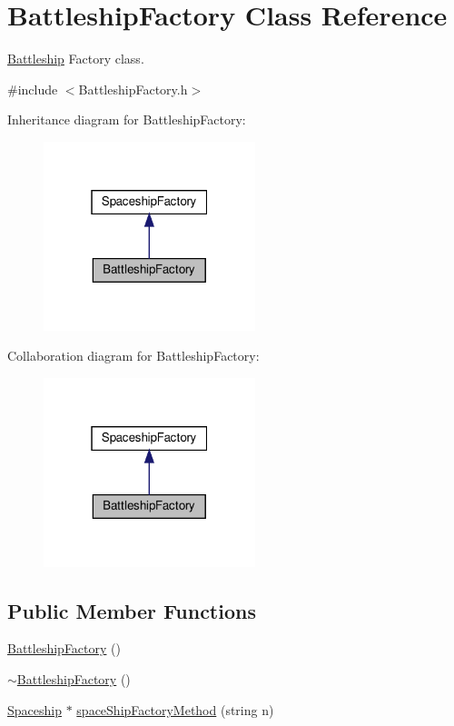 \hypertarget{classBattleshipFactory}{}\section{Battleship\+Factory Class Reference}
\label{classBattleshipFactory}


\hyperlink{classBattleship}{Battleship} Factory class.  




{\ttfamily \#include $<$Battleship\+Factory.\+h$>$}



Inheritance diagram for Battleship\+Factory\+:\nopagebreak
\begin{figure}[H]
\begin{center}
\leavevmode
\includegraphics[width=175pt]{classBattleshipFactory__inherit__graph}
\end{center}
\end{figure}


Collaboration diagram for Battleship\+Factory\+:\nopagebreak
\begin{figure}[H]
\begin{center}
\leavevmode
\includegraphics[width=175pt]{classBattleshipFactory__coll__graph}
\end{center}
\end{figure}
\subsection*{Public Member Functions}
\begin{DoxyCompactItemize}
\item 
\hyperlink{classBattleshipFactory_a98f1b363d37b3dcaaf066ba6f3dca375}{Battleship\+Factory} ()
\item 
\hyperlink{classBattleshipFactory_a18d29d1462e12301c49c2632144ff5e4}{$\sim$\+Battleship\+Factory} ()
\item 
\hyperlink{classSpaceship}{Spaceship} $\ast$ \hyperlink{classBattleshipFactory_a1d85420a3be7db3e96e9c8b33a387330}{space\+Ship\+Factory\+Method} (string n)
\end{DoxyCompactItemize}


